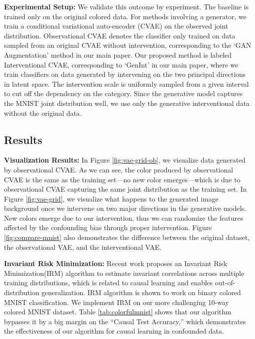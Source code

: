 \documentclass[final]{cvpr}
\begin{document}
\begin{subappendices}
\textbf{Experimental Setup:} We validate this outcome by experiment. The baseline is trained only on the original colored data. For methods involving a generator, we train a conditional variational auto-encoder (CVAE) \cite{CVAE} on the observed joint distribution. Observational CVAE denotes the classifier only trained on data sampled from an original CVAE without intervention, corresponding to the `GAN Augmentation' method in our main paper. Our proposed method is labeled Interventional CVAE, corresponding to `GenInt' in our main paper, where we train classifiers on data generated by intervening on the two principal directions in latent space. The intervention scale is uniformly sampled from a given interval to cut off the dependency on the category. Since the generative model captures the MNIST joint distribution well, we use only the generative interventional data without the original data.

\subsection{Results}

\textbf{Visualization Results:} In Figure \ref{fig:vae-grid-ob}, we visualize data generated by observational CVAE. As we can see, the color produced by observational CVAE is the same as the training set---no new color emerges---which is due to observational CVAE capturing the same joint distribution as the training set.
In Figure \ref{fig:vae-grid}, we visualize what happens to the generated image background once we intervene on two major directions in the generative models. New colors emerge due to our intervention, thus we can randomize the features affected by the confounding bias through proper intervention. Figure \ref{fig:compare-mnist} also demonstrates the difference between the original dataset, the observational VAE, and the interventional VAE.

\textbf{Invariant Risk Minimization:} Recent work \cite{arjovsky2019invariant} proposes an Invariant Risk Minimization(IRM) algorithm to estimate invariant correlations across multiple training distributions, which is related to causal learning and enables out-of-distribution generalization. IRM algorithm is shown to work on binary colored MNIST classification. We implement IRM on our more challenging 10-way colored MNIST dataset. Table \ref{tab:colorfulmnist} shows that our algorithm bypasses it by a big margin on the ``Causal Test Accuracy,'' which demonstrates the effectiveness of our algorithm for causal learning in confounded data.


\end{subappendices}
\end{document}
